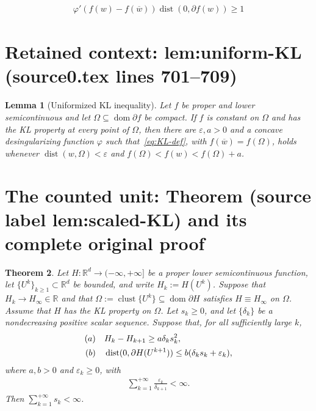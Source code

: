 \documentclass[10pt,a4paper]{amsart}
\newcommand{\R}{\mathbb R}
\DeclareMathOperator{\clust}{clust}
\DeclareMathOperator{\dist}{dist}
\DeclareMathOperator{\dom}{dom}
\theoremstyle{plain}
\newtheorem{theorem}{Theorem}[section]
\newtheorem{lemma}[theorem]{Lemma}
\theoremstyle{definition}
\theoremstyle{remark}
\begin{document}
\begin{eqnarray}\label{eq:KL-def}
 \varphi'(f(w)-f(\overline w))\dist(0,\partial f(w))\geq1
\end{eqnarray}


\section*{Retained context: lem:uniform-KL (source0.tex lines 701--709)}

\begin{lemma}[Uniformized KL inequality]\label{lem:uniform-KL}
Let $f$ be proper and lower semicontinuous and let
$\Omega\subseteq\dom\partial f$ be compact. If $f$ is constant on
$\Omega$ and has the KL property at every point of $\Omega$, then
there are $\varepsilon,a>0$ and a concave desingularizing function
$\varphi$ such that~\eqref{eq:KL-def}, with $f(\overline w)=f(\Omega)$,
holds whenever $\dist(w,\Omega)<\varepsilon$ and
$f(\Omega)<f(w)<f(\Omega)+a$.
\end{lemma}


\section{The counted unit: Theorem (source label lem:scaled-KL) and its complete original proof}

\begin{theorem}\label{lem:scaled-KL}
Let $H:\R^d\to(-\infty,+\infty]$ be a proper lower semicontinuous
function, let $\{U^k\}_{k\ge 1}\subset\R^d$ be bounded, and write
$H_k:=H(U^k)$. Suppose that $H_k\to H_\infty\in\R$ and that
$\Omega:=\clust\{U^k\}\subseteq\dom\partial H$ satisfies
$H\equiv H_\infty$ on $\Omega$. Assume that $H$ has the KL property
on $\Omega$. Let $s_k\geq0$, and let $\{\delta_k\}$ be a
nondecreasing positive scalar sequence. Suppose that, for all
sufficiently large $k$,
\begin{eqnarray*}
\begin{aligned}
\textnormal{(a)}\quad&H_k-H_{k+1}\geq a\delta_ks_k^2,\\
\textnormal{(b)}\quad&\dist(0,\partial H(U^{k+1}))
 \leq b(\delta_ks_k+\varepsilon_k),
\end{aligned}
\end{eqnarray*}
where $a,b>0$ and $\varepsilon_k\geq0$, with
\begin{eqnarray}\label{eq:abstract-error-sum}
\sum_{k=1}^{+\infty}\frac{\varepsilon_k}{\delta_{k+1}}<\infty.
\end{eqnarray}
Then $\sum_{k=1}^{+\infty} s_k<\infty$.
\end{theorem}
\end{document}
